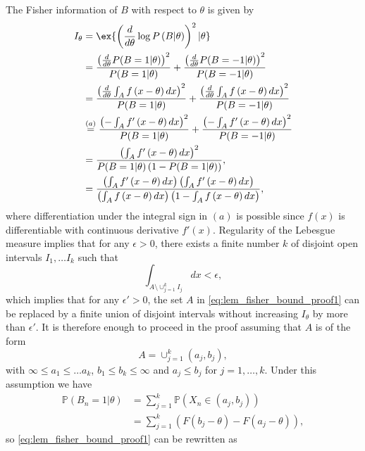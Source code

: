 The Fisher information of $B$ with respect to $\theta$ is given by
\begin{align}
I_\theta & =  \ex{ \left( \frac{d}{d\theta} \log P\left( B | \theta \right) \right)^2 |\theta } \nonumber \\
& = \frac{ \left(\frac{d}{d\theta} P(B=1|\theta) \right)^2}{P(B=1| \theta)} + \frac{ \left(\frac{d}{d\theta} P(B=-1|\theta) \right)^2} {P(B=-1| \theta)} \nonumber \\
& =  \frac{ \left( \frac{d}{d\theta} \int_A f \left( x-\theta\right)dx \right)^2} { P(B=1| \theta) } + \frac{ \left( \frac{d}{d\theta}\int_A f \left( x-\theta \right)dx \right)^2} { P(B=-1| \theta) } \nonumber \\ 
& \overset{(a)}{=} \frac{ \left( - \int_A f' \left( x-\theta \right)dx \right)^2} { P(B=1| \theta) } + \frac{ \left(- \int_A f' \left( x-\theta \right)dx \right)^2} { P(B=-1| \theta) } \nonumber \\ 
& = \frac{\left( \int_A f'\left( x-\theta \right) dx \right)^2 }{  P(B=1 | \theta) \left(1-P(B=1|\theta) \right)  }, \nonumber \\
& = \frac{\left( \int_A f'\left( x-\theta \right) dx \right) \left( \int_A f'\left( x-\theta \right) dx \right)}{ \left( \int_A f \left( x-\theta \right) dx \right)  \left(1- \int_A f \left( x-\theta \right) dx \right) }, \label{eq:lem_fisher_bound_proof1}
\end{align}
where differentiation under the integral sign in $(a)$ is possible since $f(x)$ is differentiable with continuous derivative $f'(x)$. Regularity of the Lebesgue measure implies that for any $\epsilon>0$, there exists a finite number $k$ of disjoint open intervals $I_1,\ldots I_k$ such that 
\[
\int_{A\setminus \cup_{j=1}^k I_j }  dx < \epsilon,
\]
which implies that for any $\epsilon' > 0$, the set $A$ in \eqref{eq:lem_fisher_bound_proof1} can be replaced by a finite union of disjoint intervals without increasing $I_\theta$ by more than $\epsilon'$. It is therefore enough to proceed in the proof assuming that $A$ is of the form
\[
A = \cup_{j=1}^k (a_j,b_j),
\]
with $\infty \leq a_1 \leq \ldots a_k$, $b_1 \leq b_k \leq \infty$ and $a_j \leq b_j$ for $j=1,\ldots,k$. Under this assumption we have
\begin{align*}
\mathbb P(B_n=1| \theta) & = \sum_{j=1}^k \mathbb P\left(X_n \in (a_j,b_j) \right)  \\
& = \sum_{j=1}^k \left( F \left(b_j-\theta\right) -  F \left(a_j-\theta\right)  \right),
\end{align*}
so \eqref{eq:lem_fisher_bound_proof1} can be rewritten as

